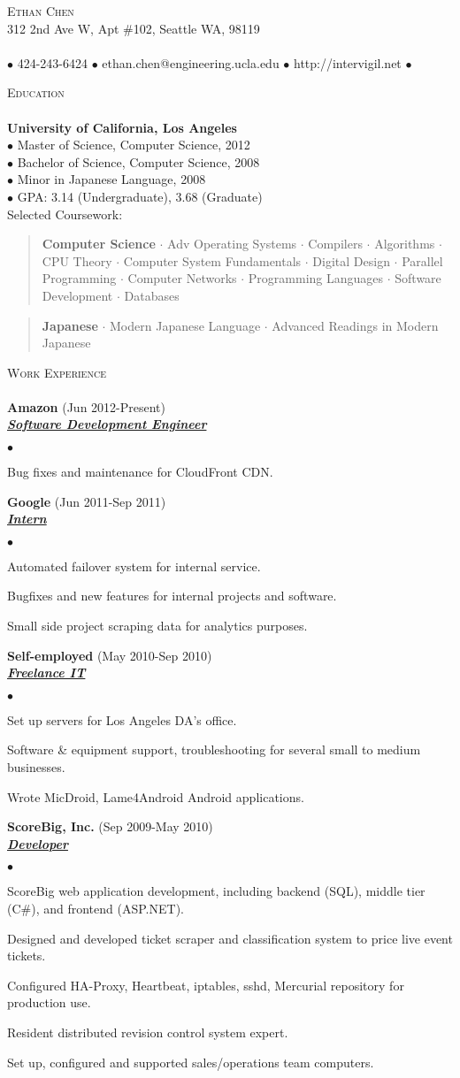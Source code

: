 \documentclass{article}
\newcommand{\area}[2]{\vspace*{-9pt} \begin{verse}\textbf{#1}   #2 \end{verse}  }
\newcommand{\lineunder}{\vspace*{-8pt} \\ \hspace*{-18pt} \hrulefill \\}
\newcommand{\header}[1]{{\hspace*{-15pt}\vspace*{6pt} \textsc{#1}} \vspace*{-6pt} \lineunder}
\newcommand{\employer}[3]{{ \textbf{#1} (#2)\\ \underline{\textbf{\emph{#3}}}\\  }}
\newcommand{\contact}[3]{
\vspace*{-8pt}
\begin{center}
{\LARGE \scshape {#1}}\\
#2 \lineunder
#3
\end{center}
\vspace*{-8pt}
}
\newenvironment{achievements}{\begin{list}{$\bullet$}{\topsep 0pt \itemsep -2pt}}{\vspace*{4pt}\end{list}}
\newcommand{\schoolwithcourses}[5]{
 \textbf{#1} \\
 $\bullet$ #2 \\
 $\bullet$ #3 \\
 $\bullet$ #4 \\
 $\bullet$ #5 \\  Selected Coursework:\\
\vspace*{5pt}
}
\begin{document}
\small
\smallskip
\vspace*{-44pt}

\contact{Ethan Chen}
{312 2nd Ave W, Apt \#102, Seattle WA, 98119}
{$\bullet$ 424-243-6424 $\bullet$ ethan.chen@engineering.ucla.edu $\bullet$ http://intervigil.net $\bullet$}

\header{Education}
\schoolwithcourses{University of California, Los Angeles}
{Master of Science, Computer Science, 2012}
{Bachelor of Science, Computer Science, 2008}
{Minor in Japanese Language, 2008}
{GPA: 3.14 (Undergraduate), 3.68 (Graduate)}
  \area{Computer Science}{ $\cdot$ Adv Operating Systems $\cdot$ Compilers $\cdot$ Algorithms $\cdot$ CPU Theory $\cdot$ Computer System Fundamentals $\cdot$ Digital Design $\cdot$ Parallel Programming $\cdot$ Computer Networks $\cdot$ Programming Languages $\cdot$ Software Development $\cdot$ Databases }
  \area{Japanese}{ $\cdot$ Modern Japanese Language $\cdot$ Advanced Readings in Modern Japanese }

\header{Work Experience}
\employer{Amazon}{Jun 2012-Present}{Software Development Engineer}
  \begin{achievements}
    \item Bug fixes and maintenance for CloudFront CDN.
  \end{achievements}

\employer{Google}{Jun 2011-Sep 2011}{Intern}
  \begin{achievements}
    \item Automated failover system for internal service.
    \item Bugfixes and new features for internal projects and software.
    \item Small side project scraping data for analytics purposes.
  \end{achievements}

\employer{Self-employed}{May 2010-Sep 2010}{Freelance IT}
  \begin{achievements}
    \item Set up servers for Los Angeles DA's office.
    \item Software \& equipment support, troubleshooting for several small to medium businesses.
    \item Wrote MicDroid, Lame4Android Android applications.
  \end{achievements}

\employer{ScoreBig, Inc.}{Sep 2009-May 2010}{Developer}
  \begin{achievements}
    \item ScoreBig web application development, including backend (SQL), middle tier (C\#), and frontend (ASP.NET).
    \item Designed and developed ticket scraper and classification system to price live event tickets.
    \item Configured HA-Proxy, Heartbeat, iptables, sshd, Mercurial repository for production use.
    \item Resident distributed revision control system expert.
    \item Set up, configured and supported sales/operations team computers.
  \end{achievements}
\end{document}
